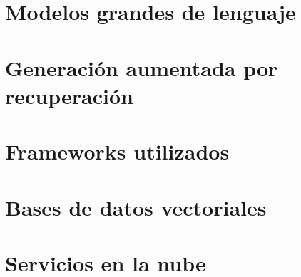 \section{Modelos grandes de lenguaje}

\section{Generación aumentada por recuperación}

\section{Frameworks utilizados}

\section{Bases de datos vectoriales}

\section{Servicios en la nube}